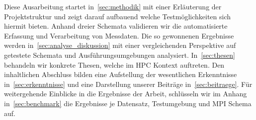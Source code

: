 Diese Ausarbeitung startet in~\ref{sec:methodik} mit einer Erläuterung der Projektstruktur und zeigt darauf aufbauend welche Testmöglichkeiten sich hiermit bieten. Anhand dreier Schemata validieren wir die automatisierte Erfassung und Verarbeitung von Messdaten. Die so gewonnenen Ergebnisse werden in~\ref{sec:analyse_diskussion} mit einer vergleichenden Perspektive auf getestete Schemata und Ausführungsumgebungen analysiert. In~\ref{sec:thesen} behandeln wir konkrete Thesen, welche im HPC Kontext auftreten.
Den inhaltlichen Abschluss bilden eine Aufstellung der wesentlichen Erkenntnisse in~\ref{sec:erkenntnisse} und eine Darstellung unserer Beiträge in~\ref{sec:beitraege}. Für weitergehende Einblicke in die Ergebnisse der Arbeit, schlüsseln wir im Anhang in~\ref{sec:benchmark} die Ergebnisse je Datensatz, Testumgebung und MPI Schema auf.
